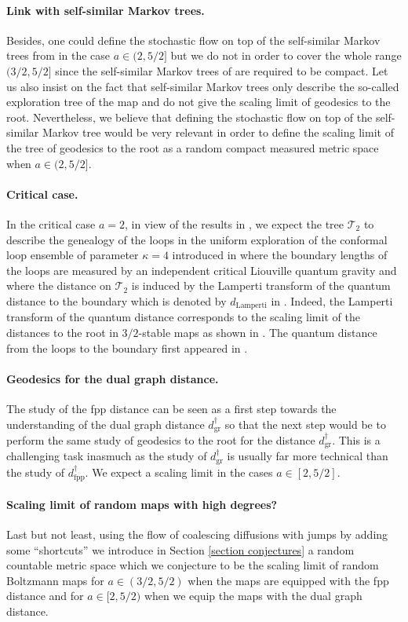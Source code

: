 \documentclass[11pt]{article}
\numberwithin{equation}{section}
\def \T{\mathcal{T}}
\begin{document}
\paragraph{Link with self-similar Markov trees.} Besides, one could define the stochastic flow on top of the self-similar Markov trees from \cite{BCR24} in the case $a \in (2, 5/2]$ but we do not in order to cover the whole range $(3/2,5/2]$ {since the self-similar Markov trees of \cite{BCR24} are required to be compact. Let us also insist on the fact that self-similar Markov trees only describe the so-called exploration tree of the map and do not give the scaling limit of geodesics to the root. Nevertheless, we believe that defining the stochastic flow on top of the self-similar Markov tree would be very relevant in order to define the scaling limit of the tree of geodesics to the root as a random compact measured metric space when $a \in (2,5/2]$.}
{
\paragraph{Critical case.} In the critical case $a=2$, in view of the results in \cite{Kam23CLE}, we expect the tree $\T_2$ to describe the genealogy of the loops in the uniform exploration of the conformal loop ensemble of parameter $\kappa=4$ introduced in \cite{WW13} where the boundary lengths of the loops are measured by an independent critical Liouville quantum gravity and where the distance on $\T_2$ is induced by the Lamperti transform of the quantum distance to the boundary which is denoted by $d_\mathrm{Lamperti}$ in \cite{Kam23CLE}. Indeed, the Lamperti transform of the quantum distance corresponds to the scaling limit of the distances to the root in $3/2$-stable maps as shown in \cite{Kam23CLE}. The quantum distance from the loops to the boundary first appeared in \cite{AHPS21}.
	
\paragraph{Geodesics for the dual graph distance.} The study of the fpp distance can be seen as a first step towards the understanding of the dual graph distance $d^\dagger_\mathrm{gr}$ so that the next step would be to perform the same study of geodesics to the root for the distance $d^\dagger_\mathrm{gr}$. This is a challenging task inasmuch as the study of $d^\dagger_\mathrm{gr}$ is usually far more technical than the study of $d^\dagger_\mathrm{fpp}$. We expect a scaling limit in the cases $a\in [2,5/2]$.
	
\paragraph{Scaling limit of random maps with high degrees?} Last but not least, using the flow of coalescing diffusions with jumps by adding some ``shortcuts'' we introduce in Section \ref{section conjectures} a random countable metric space which we conjecture to be the scaling limit of random Boltzmann maps for $a \in (3/2,5/2)$ when the maps are equipped with the fpp distance and for $a \in [2,5/2)$ when we equip the maps with the dual graph distance.}
\end{document}
